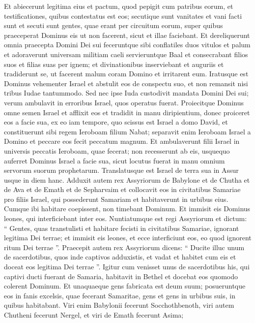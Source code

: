 \begin{biblechapter}
\begin{biblechapter}
\begin{biblechapter}
\begin{biblechapter}
\begin{biblechapter}
\begin{biblechapter}
\begin{biblechapter}
\begin{biblechapter}
\begin{biblechapter}
\begin{biblechapter}
\begin{biblechapter}
\begin{biblechapter}
\begin{biblechapter}
\begin{biblechapter}
\begin{biblechapter}
\begin{biblechapter}
\begin{biblechapter}
\verse Et abiecerunt legitima eius et pactum, quod pepigit cum patribus eorum, et testificationes, quibus contestatus est eos; secutique sunt vanitates et vani facti sunt et secuti sunt gentes, quae erant per circuitum eorum, super quibus praeceperat Dominus eis ut non facerent, sicut et illae faciebant. 
\verse Et dereliquerunt omnia praecepta Domini Dei sui feceruntque sibi conflatiles duos vitulos et palum et adoraverunt universam militiam caeli servieruntque Baal 
\verse et consecrabant filios suos et filias suas per ignem; et divinationibus inserviebant et auguriis et tradiderunt se, ut facerent malum coram Domino et irritarent eum.
 \verse Iratusque est Dominus vehementer Israel et abstulit eos de conspectu suo, et non remansit nisi tribus Iudae tantummodo. 
\verse Sed nec ipse Iuda custodivit mandata Domini Dei sui; verum ambulavit in erroribus Israel, quos operatus fuerat. 
\verse Proiecitque Dominus omne semen Israel et afflixit eos et tradidit in manu diripientium, donec proiceret eos a facie sua, 
\verse ex eo iam tempore, quo scissus est Israel a domo David, et constituerunt sibi regem Ieroboam filium Nabat; separavit enim Ieroboam Israel a Domino et peccare eos fecit peccatum magnum. 
\verse Et ambulaverunt filii Israel in universis peccatis Ieroboam, quae fecerat; non recesserunt ab eis, 
\verse usquequo auferret Dominus Israel a facie sua, sicut locutus fuerat in manu omnium servorum suorum prophetarum. Translatusque est Israel de terra sua in Assur usque in diem hanc.
 \verse Adduxit autem rex Assyriorum de Babylone et de Chutha et de Ava et de Emath et de Sepharvaim et collocavit eos in civitatibus Samariae pro filiis Israel, qui possederunt Samariam et habitaverunt in urbibus eius.
 \verse Cumque ibi habitare coepissent, non timebant Dominum. Et immisit eis Dominus leones, qui interficiebant inter eos. 
\verse Nuntiatumque est regi Assyriorum et dictum: “ Gentes, quas transtulisti et habitare fecisti in civitatibus Samariae, ignorant legitima Dei terrae; et immisit eis leones, et ecce interficiunt eos, eo quod ignorent ritum Dei terrae ”. 
\verse Praecepit autem rex Assyriorum dicens: “ Ducite illuc unum de sacerdotibus, quos inde captivos adduxistis, et vadat et habitet cum eis et doceat eos legitima Dei terrae ”. 
\verse Igitur cum venisset unus de sacerdotibus his, qui captivi ducti fuerant de Samaria, habitavit in Bethel et docebat eos quomodo colerent Dominum.
 \verse Et unaquaeque gens fabricata est deum suum; posueruntque eos in fanis excelsis, quae fecerant Samaritae, gens et gens in urbibus suis, in quibus habitabant. 
\verse Viri enim Babylonii fecerunt Socchothbenoth, viri autem Chutheni fecerunt Nergel, et viri de Emath fecerunt Asima; 

\end{biblechapter}
\end{biblechapter}
\end{biblechapter}
\end{biblechapter}
\end{biblechapter}
\end{biblechapter}
\end{biblechapter}
\end{biblechapter}
\end{biblechapter}
\end{biblechapter}
\end{biblechapter}
\end{biblechapter}
\end{biblechapter}
\end{biblechapter}
\end{biblechapter}
\end{biblechapter}
\end{biblechapter}
